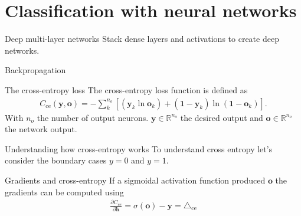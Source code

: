 \documentclass{beamer}
\begin{document}
    \section{Classification with neural networks}

    \begin{frame}{Deep multi-layer networks}
      Stack dense layers and activations to create deep networks. \\
      \begin{figure}
         
      \end{figure}
    \end{frame}

    \begin{frame}{Backpropagation}
      \begin{figure}
         
      \end{figure}
    \end{frame}

    \begin{frame}{The cross-entropy loss}
      The cross-entropy loss function is defined as \cite{nielsen2015neural, bishop2006pattern}
      \begin{align} \label{eq:ce}
       C_{\text{ce}}(\mathbf{y}, \mathbf{o}) = -\sum_k^{n_o} [( \mathbf{y}_k  \ln \mathbf{o}_k) 
                                  + (\mathbf{1} - \mathbf{y}_k)
                                     \ln(\mathbf{1} - \mathbf{o}_k)].
      \end{align}
      With $n_o$ the number of output neurons. $\mathbf{y} \in \mathbb{R}^{n_o}$ the desired output and
      $\mathbf{o} \in \mathbb{R}^{n_o}$ the network output.
    \end{frame}

    \begin{frame}{Understanding how cross-entropy works}
      To understand cross entropy let's consider the boundary cases $y=0$ and $y=1$.
      \begin{figure}
        
        
      \end{figure}
    \end{frame}

    \begin{frame}{Gradients and cross-entropy}
      If a sigmoidal activation function produced $\mathbf{o}$ the gradients can be computed using ~\cite{nielsen2015neural,bishop2006pattern}
      \begin{align} 
         \frac{\partial C_{ce}}{\partial \mathbf{h}} 
         = \sigma(\mathbf{o}) - \mathbf{y} = \triangle_{\text{ce}}
      \end{align}
    \end{frame}
\end{document}
